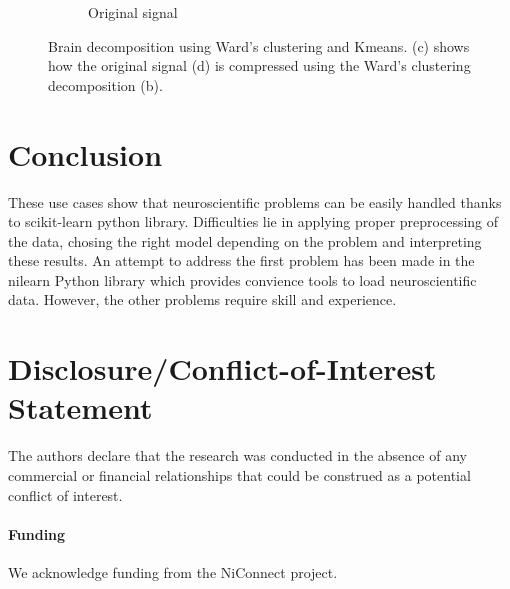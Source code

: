 \documentclass{frontiersSCNS} %
\begin{document}
\begin{figure}[hbtp]
\begin{center}
\begin{subfigure}[b]{.23\linewidth}
        \caption{Original signal}
      \end{subfigure}
  \end{center}
  \caption{Brain decomposition using Ward's clustering and Kmeans. (c) shows how the original
  signal (d) is compressed using the Ward's clustering decomposition (b).}
  \label{fig:clustering}
\end{figure}

\section{Conclusion}

These use cases show that neuroscientific problems can be easily handled thanks
to scikit-learn python library. Difficulties lie in applying proper preprocessing of
the data, chosing the right model depending on the problem and interpreting
these results. An attempt to
address the first problem has been made in the nilearn Python library which
provides convience tools to load neuroscientific data. However, the other
problems require skill and experience.


\section*{Disclosure/Conflict-of-Interest Statement}
The authors declare that the research was conducted in the absence of any
commercial or financial relationships that could be construed as a potential
conflict of interest.

\paragraph{Funding\textcolon} We acknowledge funding from the NiConnect project.


\end{document}
